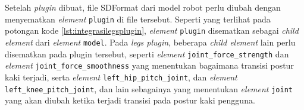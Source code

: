 

Setelah \emph{plugin} dibuat,
  file SDFormat dari model robot perlu diubah dengan menyematkan \emph{element} \lstinline{plugin} di file tersebut.
Seperti yang terlihat pada potongan kode \ref{lst:integrasilegsplugin},
  \emph{element} \lstinline{plugin} disematkan sebagai \emph{child element} dari \emph{element} \lstinline{model}.
Pada \emph{legs plugin},
  beberapa \emph{child element} lain perlu disematkan pada plugin tersebut,
  seperti \emph{element} \lstinline{joint_force_strength} dan \emph{element} \lstinline{joint_force_smoothness} yang menentukan bagaimana transisi postur kaki terjadi,
  serta \emph{element} \lstinline{left_hip_pitch_joint}, dan \emph{element} \lstinline{left_knee_pitch_joint}, dan lain sebagainya yang menentukan \emph{element} \lstinline{joint} yang akan diubah ketika terjadi transisi pada postur kaki pengguna.

